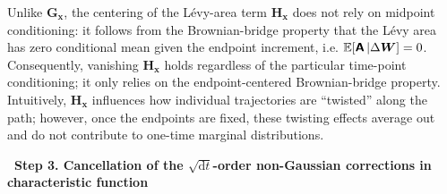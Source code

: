 Unlike $\bm{G}_{\bm x}$, the centering of the L\'evy-area term $\bm{H}_{\bm x}$ does not rely on midpoint conditioning: it follows from the Brownian-bridge property that the L\'evy area has zero conditional mean given the endpoint increment, i.e. $\mathbb{E}[\boldsymbol{\mathsf{A}}\,\vert\Delta\bm{W}]=0$. Consequently, vanishing $\bm{H}_{\bm{x}}$ holds regardless of the particular time-point conditioning; it only relies on the endpoint-centered Brownian-bridge property.
Intuitively, $\bm{H}_{\bm{x}}$ influences how individual trajectories are ``twisted'' along the path; however, once the endpoints are fixed, these twisting effects average out and do not contribute to one-time marginal distributions.

\bigskip
\noindent\textbf{\textbullet\ Step 3. Cancellation of the $\sqrt{\mathrm{d}t}$-order non-Gaussian corrections in characteristic function} 

